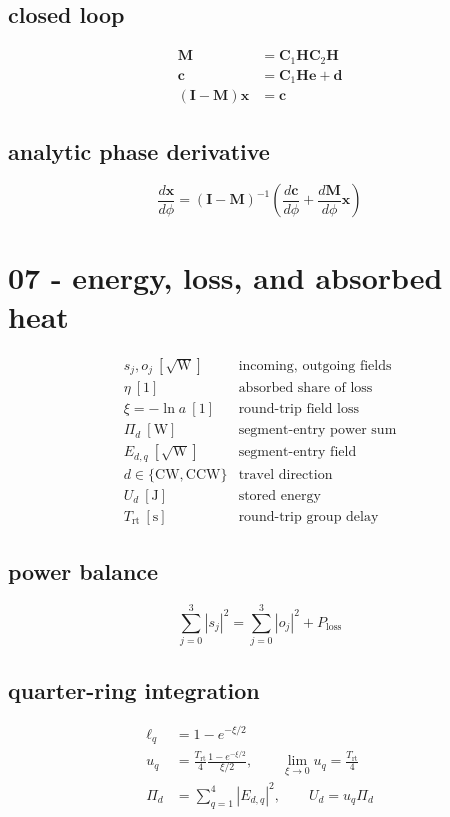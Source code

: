 \subsection*{closed loop}
\[
\displaystyle \begin{aligned}\mathbf M&=\mathbf C_1\mathbf H\mathbf C_2\mathbf H\\\mathbf c&=\mathbf C_1\mathbf H\mathbf e+\mathbf d\\(\mathbf I-\mathbf M)\mathbf x&=\mathbf c\end{aligned}
\]

\subsection*{analytic phase derivative}
\[
\displaystyle \frac{d\mathbf x}{d\phi}=(\mathbf I-\mathbf M)^{-1}\!\left(\frac{d\mathbf c}{d\phi}+\frac{d\mathbf M}{d\phi}\mathbf x\right)
\]

\clearpage
\section*{07 - energy, loss, and absorbed heat}

\[
\begin{array}{ll}s_j,o_j\ [\sqrt{\mathrm W}]&\text{incoming, outgoing fields}\\[0.6em]\eta\ [1]&\text{absorbed share of loss}\\[0.6em]\xi=-\ln a\ [1]&\text{round-trip field loss}\\[0.6em]\Pi_d\ [\mathrm W]&\text{segment-entry power sum}\\[0.6em]E_{d,q}\ [\sqrt{\mathrm W}]&\text{segment-entry field}\\[0.6em]d\in\{\mathrm{CW},\mathrm{CCW}\}&\text{travel direction}\\[0.6em]U_d\ [\mathrm J]&\text{stored energy}\\[0.6em]T_{\mathrm{rt}}\ [\mathrm s]&\text{round-trip group delay}\end{array}
\]

\subsection*{power balance}
\[
\displaystyle \sum_{j=0}^{3}|s_j|^2=\sum_{j=0}^{3}|o_j|^2+P_{\mathrm{loss}}
\]

\subsection*{quarter-ring integration}
\[
\displaystyle \begin{aligned}\ell_q&=1-e^{-\xi/2}\\u_q&=\frac{T_{\mathrm{rt}}}{4}\frac{1-e^{-\xi/2}}{\xi/2},\qquad\lim_{\xi\to0}u_q=\frac{T_{\mathrm{rt}}}{4}\\\Pi_d&=\sum_{q=1}^{4}|E_{d,q}|^2,\qquad U_d=u_q\Pi_d\end{aligned}
\]

